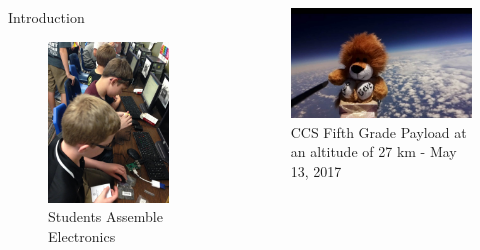 \documentclass[final]{beamer}
\newlength{\sepwid}
\newlength{\onecolwid}
\newlength{\twocolwid}
\begin{document}
\begin{frame}[t]
\begin{columns}[t]
\begin{column}{\onecolwid}
\begin{block}{Introduction}
\end{block}


\begin{figure}
\includegraphics[width=0.6\linewidth]{CCS_Electronics}
\caption{Students Assemble Electronics}
\end{figure}


\end{column} %

\begin{column}{\sepwid}\end{column} %

\begin{column}{\twocolwid} %


\begin{figure}
    \includegraphics[width=0.8\linewidth]{lion}
    \caption{CCS Fifth Grade Payload at an altitude of 27 km - May 13, 2017}
\end{figure}


\end{column}
\end{columns}
\end{frame}
\end{document}
